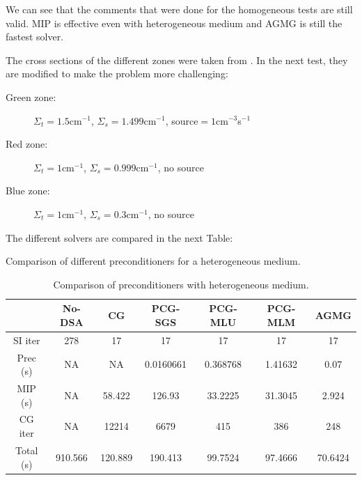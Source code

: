 We can see that the comments that were done for the homogeneous tests are
still valid. MIP is effective even with heterogeneous medium and AGMG is
still the fastest solver.

The cross sections of the different zones were taken from \cite{mip}. In the
next test, they are modified to make the problem more challenging:
\begin{description}
  \item[Green zone:] $\Sigma_t =1.5$cm$^{-1}$, $\Sigma_s = 1.499$cm$^{-1}$, source$ =
    1$cm$^{-3}$s$^{-1}$
  \item[Red zone:] $\Sigma_t = 1$cm$^{-1}$, $\Sigma_s = 0.999$cm$^{-1}$, no source
  \item[Blue zone:] $\Sigma_t = 1$cm$^{-1}$, $\Sigma_s = 0.3$cm$^{-1}$, no source
\end{description}
The different solvers are compared in the next Table:
\begin{table}[H]
  \begin{center}
    \caption{Comparison of different preconditioners for a heterogeneous medium.}
    \begin{tabular}{|c|c|c|c|c|c|c|}
      \hline
      & No-DSA & CG & PCG-SGS & PCG-MLU & PCG-MLM & AGMG\\
      \hline
      SI iter   & 278     & 17      & 17        & 17       & 17      & 17 \\
      Prec (s)  & NA      & NA      & 0.0160661 & 0.368768 & 1.41632 & 0.07 \\
      MIP (s)   & NA      & 58.422  & 126.93    & 33.2225  & 31.3045 & 2.924 \\
      CG iter   & NA      & 12214   & 6679      & 415      & 386     & 248 \\
      Total (s) & 910.566 & 120.889 & 190.413   & 99.7524  & 97.4666 & 70.6424 \\
      \hline
    \end{tabular}
    \caption{Comparison of preconditioners with heterogeneous medium.}
  \end{center}
\end{table}

